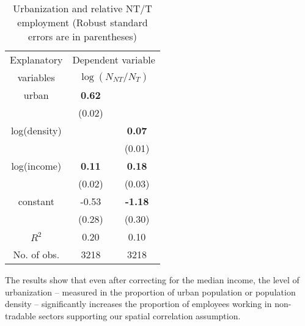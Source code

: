 \documentclass[12pt]{article}
\begin{document}
\begin{table}[h]
\center \caption{Urbanization and relative NT/T employment (Robust
standard errors are in parentheses)}
\begin{tabular}{c|cc}
  \hline\hline
  Explanatory & \multicolumn{2}{c}{Dependent variable} \\
  variables & \multicolumn{2}{c}{$\log (N_{NT}/N_T)$} \\ \hline
  urban         & \textbf{0.62} &  \\
                & (0.02)        &  \\
  log(density)  &               & \textbf{0.07} \\
                &               & (0.01) \\
  log(income)   & \textbf{0.11} & \textbf{0.18} \\
                & (0.02)        & (0.03) \\
  constant      & -0.53         & \textbf{-1.18} \\
                & (0.28)        & (0.30) \\ \hline
  $R^2$         & 0.20          & 0.10 \\
  No. of obs.   & 3218          & 3218 \\ \hline\hline
\end{tabular}
\end{table}

The results show that even after correcting for the median income,
the level of urbanization -- measured in the proportion of urban
population or population density -- significantly increases the
proportion of employees working in non-tradable sectors supporting
our spatial correlation assumption.
\end{document}
